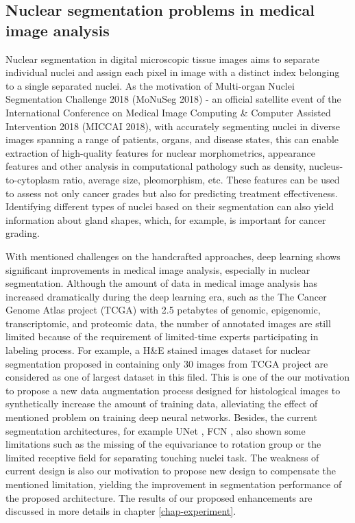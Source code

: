 \subsection{Nuclear segmentation problems in medical image analysis}

Nuclear segmentation in digital microscopic tissue images aims to separate individual nuclei and assign each pixel in image with a distinct index belonging to a single separated nuclei. As the motivation of Multi-organ Nuclei Segmentation Challenge 2018 (MoNuSeg 2018) \cite{monuseg} -  an official satellite event of the International Conference on Medical Image Computing \& Computer Assisted Intervention 2018 (MICCAI 2018), with accurately segmenting nuclei in diverse images spanning a range of patients, organs, and disease states, this can enable extraction of high-quality features for nuclear morphometrics, appearance features and other analysis in computational pathology such as density, nucleus-to-cytoplasm ratio, average size, pleomorphism, etc. These features can be used to assess not only cancer grades but also for predicting treatment effectiveness. Identifying different types of nuclei based on their segmentation can also yield information about gland shapes, which, for example, is important for cancer grading.

With mentioned challenges on the handcrafted approaches, deep learning shows significant improvements in medical image analysis, especially in nuclear segmentation. Although the amount of data in medical image analysis has increased dramatically during the deep learning era, such as the The Cancer Genome Atlas project (TCGA) \cite{tcga} with 2.5 petabytes of genomic, epigenomic, transcriptomic, and proteomic data, the number of annotated images are still limited because of the requirement of limited-time experts participating in labeling process. For example, a H\&E stained images dataset for nuclear segmentation proposed in \cite{he_dataset_kumar} containing only 30 images from TCGA project \cite{tcga} are considered as one of largest dataset in this filed. This is one of the our motivation to propose a new data augmentation process designed for histological images to synthetically increase the amount of training data, alleviating the effect of mentioned problem on training deep neural networks. Besides, the current segmentation architectures, for example UNet \cite{unet}, FCN \cite{FCNs}, also shown some limitations such as the missing of the equivariance to rotation group or the limited receptive field for separating touching nuclei task. The weakness of current design is also our motivation to propose new design to compensate the mentioned limitation, yielding the improvement in segmentation performance of the proposed architecture. The results of our proposed enhancements are discussed in more details in chapter \ref{chap-experiment}.


